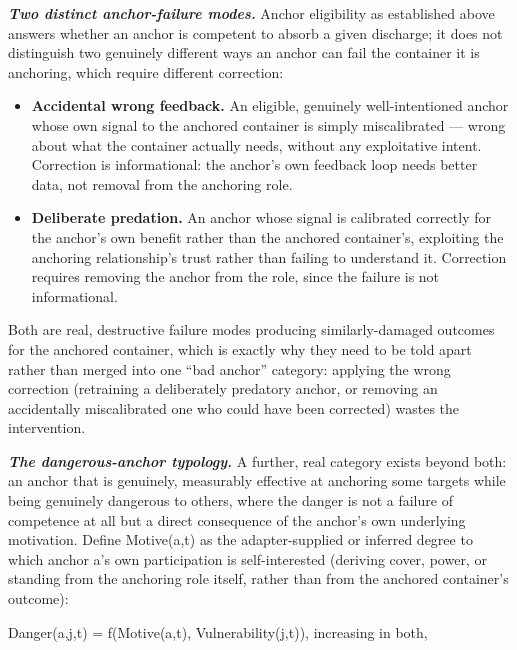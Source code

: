 \documentclass[
]{article}
\begin{document}
\emph{\textbf{Two distinct anchor-failure modes.}} Anchor eligibility as
established above answers whether an anchor is competent to absorb a
given discharge; it does not distinguish two genuinely different ways an
anchor can fail the container it is anchoring, which require different
correction:

\begin{itemize}
\item
  \textbf{Accidental wrong feedback.} An eligible, genuinely
  well-intentioned anchor whose own signal to the anchored container is
  simply miscalibrated --- wrong about what the container actually
  needs, without any exploitative intent. Correction is informational:
  the anchor's own feedback loop needs better data, not removal from the
  anchoring role.
\item
  \textbf{Deliberate predation.} An anchor whose signal is calibrated
  correctly for the anchor's own benefit rather than the anchored
  container's, exploiting the anchoring relationship's trust rather than
  failing to understand it. Correction requires removing the anchor from
  the role, since the failure is not informational.
\end{itemize}

Both are real, destructive failure modes producing similarly-damaged
outcomes for the anchored container, which is exactly why they need to
be told apart rather than merged into one ``bad anchor'' category:
applying the wrong correction (retraining a deliberately predatory
anchor, or removing an accidentally miscalibrated one who could have
been corrected) wastes the intervention.

\emph{\textbf{The dangerous-anchor typology.}} A further, real category
exists beyond both: an anchor that is genuinely, measurably effective at
anchoring some targets while being genuinely dangerous to others, where
the danger is not a failure of competence at all but a direct
consequence of the anchor's own underlying motivation. Define
Motive(a,t) as the adapter-supplied or inferred degree to which anchor
a's own participation is self-interested (deriving cover, power, or
standing from the anchoring role itself, rather than from the anchored
container's outcome):

Danger(a,j,t) = f(Motive(a,t), Vulnerability(j,t)), increasing in both,
\end{document}
